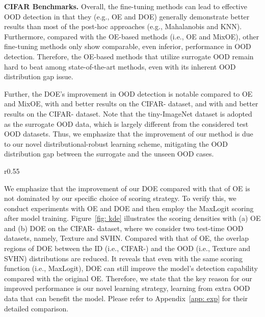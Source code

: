 \documentclass{article} \usepackage{iclr2022_conference,times}
\begin{document}
\textbf{CIFAR Benchmarks.} Overall, the fine-tuning methods can lead to effective OOD detection in that they (e.g., OE and DOE) generally demonstrate better results than most of the post-hoc approaches (e.g., Mahalanobis and KNN). Furthermore, compared with the OE-based methods (i.e., OE and MixOE), other fine-tuning methods only show comparable, even inferior, performance in OOD detection. Therefore, the OE-based methods that utilize surrogate OOD remain hard to beat among state-of-the-art methods, even with its inherent OOD distribution gap issue. 



Further, the DOE's improvement in OOD detection is notable compared to OE and MixOE, with { and } better results on the CIFAR- dataset, and with { and } better results on the CIFAR- dataset. Note that the tiny-ImageNet dataset is adopted as the surrogate OOD data, which is largely different from the considered test OOD datasets. Thus, we emphasize that the improvement of our method is due to our novel distributional-robust learning scheme, mitigating the OOD distribution gap between the surrogate and the unseen OOD cases. 



\begin{wrapfigure}{r}{0.55\textwidth}
    \centering
    \vspace{-7pt}
    \caption{
    The scoring densities of OE and DOE on CIFAR-100 dataset, where the MaxLogit is employed. }
    \label{fig: kde}
\end{wrapfigure}

We emphasize that the improvement of our DOE compared with that of OE is not dominated by our specific choice of scoring strategy. To verify this, we conduct experiments with OE and DOE and then employ the MaxLogit scoring after model training. Figure~\ref{fig: kde} illustrates the scoring densities with (a) OE and (b) DOE on the CIFAR- dataset, where we consider two test-time OOD datasets, namely, Texture and SVHN. Compared with that of OE, the overlap regions of DOE between the ID (i.e., CIFAR-) and the OOD (i.e., Texture and SVHN) distributions are reduced. It reveals that even with the same scoring function (i.e., MaxLogit), DOE can still improve the model's detection capability compared with the original OE. Therefore, we state that the key reason for our improved performance is our novel learning strategy, learning from extra OOD data that can benefit the model. Please refer to {Appendix~\ref{app: exp}} for their detailed comparison. 
\end{document}
